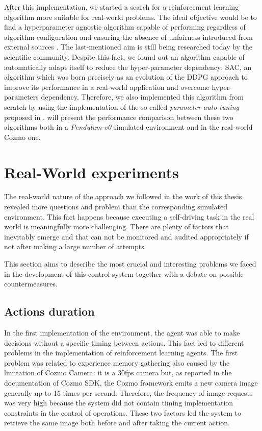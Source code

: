After this implementation, we started a search for a reinforcement learning algorithm more suitable for real-world problems.
The ideal objective would be to find a hyperparameter agnostic algorithm capable of performing regardless of algorithm configuration and ensuring the absence of unfairness introduced from external sources \cite{henderson2018deep}.
The last-mentioned aim is still being researched today by the scientific community.
Despite this fact, we found out an algorithm capable of automatically adapt itself to reduce the hyper-parameter dependency: SAC, an algorithm which was born precisely as an evolution of the DDPG approach to improve its performance in a real-world application and overcome hyper-parameters dependency.
Therefore, we also implemented this algorithm from scratch by using the implementation of the so-called \textit{parameter auto-tuning} proposed in \cite{haarnoja2018soft, haarnoja2018alg}.
 will present the performance comparison between these two algorithms both in a \textit{Pendulum-v0} simulated environment and in the real-world Cozmo one.

\section{Real-World experiments}

The real-world nature of the approach we followed in the work of this thesis revealed more questions and problem than the corresponding simulated environment. This fact happens because executing a self-driving task in the real world is meaningfully more challenging. There are plenty of factors that inevitably emerge and that can not be monitored and audited appropriately if not after making a large number of attempts.

This section aims to describe the most crucial and interesting problems we faced in the development of this control system together with a debate on possible countermeasures.

\subsection{Actions duration} \label{subsec:actions-duration}

In the first implementation of the environment, the agent was able to make decisions without a specific timing between actions.
This fact led to different problems in the implementation of reinforcement learning agents.
The first problem was related to experience memory gathering also caused by the limitation of Cozmo Camera: it is a 30fps camera but, as reported in the documentation of Cozmo SDK, the Cozmo framework emits a new camera image generally up to 15 times per second.
Therefore, the frequency of image requests was very high because the system did not contain timing implementation constraints in the control of operations.
These two factors led the system to retrieve the same image both before and after taking the current action.

